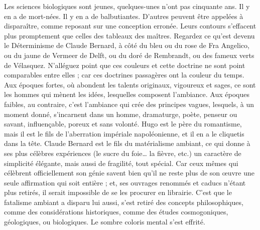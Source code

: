 \documentclass[french,twoside]{book} %
\begin{document}
Les sciences biologiques sont jeunes, quelques-unes n’ont pas cinquante ans. Il y en a de mort-nées. Il y en a de balbutiantes. D’autres peuvent être appelées à disparaître, comme reposant sur une conception erronée. Leurs contours s’effacent plus promptement que celles des tableaux des maîtres. Regardez ce qu’est devenu le Déterminisme de Claude Bernard, à côté du bleu ou du rose de Fra Angelico, ou du jaune de Vermeer de Delft, ou du doré de Rembrandt, ou des fameux verts de Vélasquez. N’alléguez point que ces couleurs et cette doctrine ne sont point comparables entre elles ; car ces doctrines passagères ont la couleur du temps. Aux époques fortes, où abondent les talents originaux, vigoureux et sages, ce sont les hommes qui mènent les idées, lesquelles composent l’ambiance. Aux époques faibles, au contraire, c’est l’ambiance qui crée des principes vagues, lesquels, à un moment donné, s’incarnent dans un homme, dramaturge, poète, penseur ou savant, influençable, poreux et sans volonté. Hugo est le père du romantisme, mais il est le fils de l’aberration impériale napoléonienne, et il en a le cliquetis dans la tête. Claude Bernard est le fils du matérialisme ambiant, ce qui donne à ses plus célèbres expériences (le sucre du foie… la fièvre, etc.) un caractère de simplicité élégante, mais aussi de fragilité, tout spécial. Car ceux mêmes qui célèbrent officiellement son génie savent bien qu’il ne reste plus de son œuvre une seule affirmation qui soit entière ; et, ses ouvrages renommés et caducs n’étant plus retirés, il serait impossible de se les procurer en librairie. C’est que le fatalisme ambiant a disparu lui aussi, s’est retiré des concepts philosophiques, comme des considérations historiques, comme des études cosmogoniques, géologiques, ou biologiques. Le sombre coloris mental s’est effrité.\par
\end{document}
